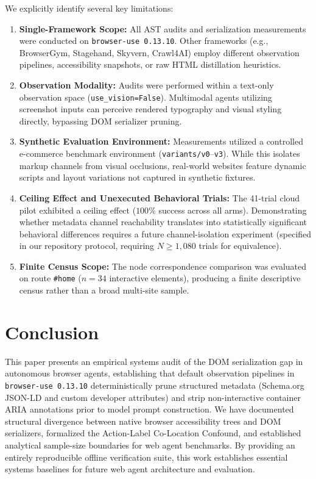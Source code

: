 \documentclass[11pt,a4paper]{article}
\begin{document}
We explicitly identify several key limitations:
\begin{enumerate}
    \item \textbf{Single-Framework Scope:} All AST audits and serialization measurements were conducted on \texttt{browser-use 0.13.10}. Other frameworks (e.g., BrowserGym, Stagehand, Skyvern, Crawl4AI) employ different observation pipelines, accessibility snapshots, or raw HTML distillation heuristics.
    \item \textbf{Observation Modality:} Audits were performed within a text-only observation space (\texttt{use\_vision=False}). Multimodal agents utilizing screenshot inputs can perceive rendered typography and visual styling directly, bypassing DOM serializer pruning.
    \item \textbf{Synthetic Evaluation Environment:} Measurements utilized a controlled e-commerce benchmark environment (\texttt{variants/v0}--\texttt{v3}). While this isolates markup channels from visual occlusions, real-world websites feature dynamic scripts and layout variations not captured in synthetic fixtures.
    \item \textbf{Ceiling Effect and Unexecuted Behavioral Trials:} The 41-trial cloud pilot exhibited a ceiling effect ($100\%$ success across all arms). Demonstrating whether metadata channel reachability translates into statistically significant behavioral differences requires a future channel-isolation experiment (specified in our repository protocol, requiring $N \ge 1,080$ trials for equivalence).
    \item \textbf{Finite Census Scope:} The node correspondence comparison was evaluated on route \texttt{\#home} ($n=34$ interactive elements), producing a finite descriptive census rather than a broad multi-site sample.
\end{enumerate}

\section{Conclusion}
\label{sec:conclusion}

This paper presents an empirical systems audit of the DOM serialization gap in autonomous browser agents, establishing that default observation pipelines in \texttt{browser-use 0.13.10} deterministically prune structured metadata (Schema.org JSON-LD and custom developer attributes) and strip non-interactive container ARIA annotations prior to model prompt construction. We have documented structural divergence between native browser accessibility trees and DOM serializers, formalized the Action-Label Co-Location Confound, and established analytical sample-size boundaries for web agent benchmarks. By providing an entirely reproducible offline verification suite, this work establishes essential systems baselines for future web agent architecture and evaluation.
\end{document}
